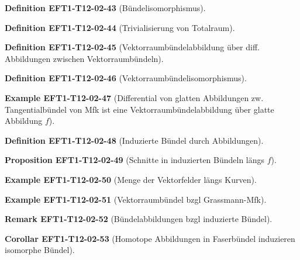 \documentclass[10pt, letterpaper]{article}
\newcommand{\CustomHeading}[3]{%
  \par\medskip\noindent%
  \textbf{#1 #2} \textnormal{(#3)}.\enskip%
}
\newenvironment{DEF}[2]{\CustomHeading{Definition}{#1}{#2}}{}
\newenvironment{PROP}[2]{\CustomHeading{Proposition}{#1}{#2}}{}
\newenvironment{KORO}[2]{\CustomHeading{Corollar}{#1}{#2}}{}
\newenvironment{REM}[2]{\CustomHeading{Remark}{#1}{#2}}{}
\newenvironment{EXA}[2]{\CustomHeading{Example}{#1}{#2}}{}
\begin{document}
\begin{DEF}{EFT1-T12-02-43}{Bündelisomorphismus}
\end{DEF}

\begin{DEF}{EFT1-T12-02-44}{Trivialisierung von Totalraum}
\end{DEF}

\begin{DEF}{EFT1-T12-02-45}{Vektorraumbündelabbildung über diff. Abbildungen zwischen Vektorraumbündeln}
\end{DEF}

\begin{DEF}{EFT1-T12-02-46}{Vektorraumbündelisomorphismus}
\end{DEF}

\begin{EXA}{EFT1-T12-02-47}{Differential von glatten Abbildungen zw. Tangentialbündel von Mfk ist eine Vektorraumbündelabbildung über glatte Abbildung $f$}
\end{EXA}

\begin{DEF}{EFT1-T12-02-48}{Induzierte Bündel durch Abbildungen}
\end{DEF}

\begin{PROP}{EFT1-T12-02-49}{Schnitte in induzierten Bündeln längs $f$}
\end{PROP}

\begin{EXA}{EFT1-T12-02-50}{Menge der Vektorfelder längs Kurven}
\end{EXA}

\begin{EXA}{EFT1-T12-02-51}{Vektorraumbündel bzgl Grassmann-Mfk}
\end{EXA}

\begin{REM}{EFT1-T12-02-52}{Bündelabbildungen bzgl induzierte Bündel}
\end{REM}

\begin{KORO}{EFT1-T12-02-53}{Homotope Abbildungen in Faserbündel induzieren isomorphe Bündel}
\end{KORO}
\end{document}
